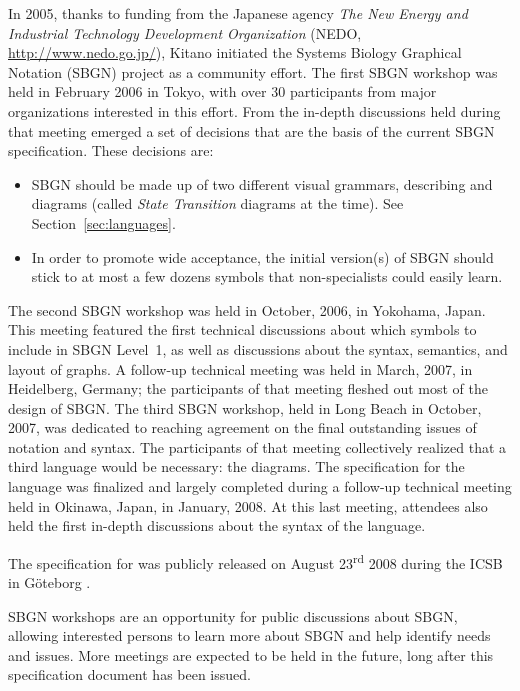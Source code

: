 In 2005, thanks to funding from the Japanese agency \emph{The New Energy and Industrial Technology Development Organization} (NEDO, \url{http://www.nedo.go.jp/}), Kitano initiated the Systems Biology Graphical Notation (SBGN) project as a community effort.  The first SBGN workshop was held in February 2006 in Tokyo, with over 30 participants from major organizations interested in this effort.  From the in-depth discussions held during that meeting emerged a set of decisions that are the basis of the current SBGN specification.  These decisions are:

\begin{itemize}

\item SBGN should be made up of two different visual grammars, describing \ER{} and \PD{} diagrams (called \emph{State Transition} diagrams at the time).  See Section~\vref{sec:languages}.

\item In order to promote wide acceptance, the initial version(s) of SBGN should stick to at most a few dozens symbols that non-specialists could easily learn.

\end{itemize}

The second SBGN workshop was held in October, 2006, in Yokohama, Japan.  This meeting featured the first technical discussions about which symbols to include in SBGN Level~1, as well as discussions about the syntax, semantics, and layout of graphs.  A follow-up technical meeting was held in March, 2007, in Heidelberg, Germany; the participants of that meeting fleshed out most of the design of SBGN.  The third SBGN workshop, held in Long Beach in October, 2007, was dedicated to reaching agreement on the final outstanding issues of notation and syntax.  The participants of that meeting collectively realized that a third language would be necessary: the \AF diagrams.  The specification for the \PD language was finalized and largely completed during a follow-up technical meeting held in Okinawa, Japan, in January, 2008.  At this last meeting, attendees also held the first in-depth discussions about the syntax of the \ER language.

The specification for \SBGNPDLone was publicly released on August 23\textsuperscript{rd} 2008 during the ICSB in G\"oteborg \cite{Lenov:2008}.

SBGN workshops are an opportunity for public discussions about SBGN, allowing interested persons to learn more about SBGN and help identify needs and issues.  More meetings are expected to be held in the future, long after this specification document has been issued.


